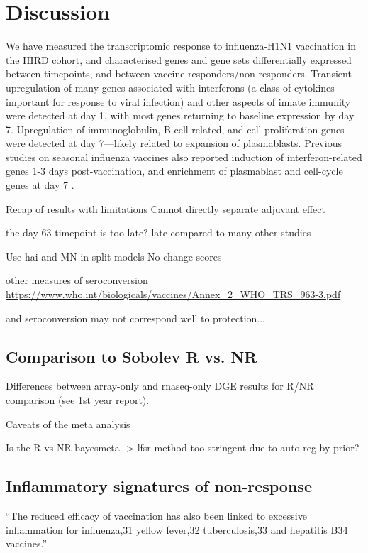 \section{Discussion}
We have measured the transcriptomic response to influenza-H1N1 vaccination in the HIRD cohort, and characterised genes and gene sets differentially expressed between timepoints, and between vaccine responders/non-responders.
Transient upregulation of many genes associated with interferons (a class of cytokines important for response to viral infection) and other aspects of innate immunity were detected at day 1, with most genes returning to baseline expression by day 7.
Upregulation of immunoglobulin, B cell-related, and cell proliferation genes were detected at day 7---likely related to expansion of plasmablasts.
Previous studies on seasonal influenza vaccines also reported induction of interferon-related genes 1-3 days post-vaccination, and enrichment of plasmablast and cell-cycle genes at day 7 \autocite{Nakaya2011, Franco2013, Nakaya2015a}.

\begin{outline}
\1 Recap of results with limitations
\1 Cannot directly separate adjuvant effect
\end{outline}

the day 63 timepoint is too late?
late compared to many other studies

Use hai and MN in split models
No change scores

other measures of seroconversion \url{https://www.who.int/biologicals/vaccines/Annex_2_WHO_TRS_963-3.pdf}

and seroconversion may not correspond well to protection...

\subsection{Comparison to Sobolev R vs. NR}

\begin{outline}
\1 Differences between array-only and rnaseq-only DGE results for R/NR comparison (see 1st year report).

\1 Caveats of the meta analysis

\1 Is the R vs NR bayesmeta -> lfsr method too stringent due to auto reg by prior?
\end{outline}

\subsection{Inflammatory signatures of non-response}

\enquote{The reduced efficacy of vaccination has also been linked to excessive inflammation for influenza,31 yellow fever,32 tuberculosis,33 and hepatitis B34 vaccines.}

